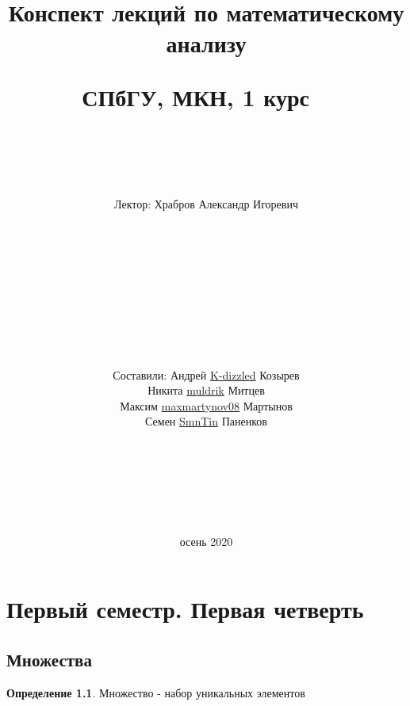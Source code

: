 \documentclass[12pt,letterpaper]{report}
\title{Конспект лекций по математическому анализу

СПбГУ, МКН, 1 курс
\ \\
\ \\ \ \\
}
\author{Лектор: Храбров Александр Игоревич \\
\ \\ \ \\ \ \\ \ \\ \ \\ \ \\ \ \\ \ \\
\ \\ 
\begin{flushright}
Составили: Андрей \href{https://github.com/K-dizzled}{K-dizzled} Козырев \\ Никита  \href{https://github.com/muldrik}{muldrik} Митцев \\ Максим \href{https://github.com/maxmartynov08}{maxmartynov08} Мартынов \\ Семен \href{https://github.com/SmnTin}{SmnTin} Паненков
\end{flushright}
\ \\
\ \\
\ \\
\ \\
\ \\
\ \\}
\date{осень 2020}
\theoremstyle{definition}
\newtheorem*{conj}{Определение}
\begin{document}
\fi
\maketitle
\tableofcontents
\newpage
\chapter{Первый семестр. Первая четверть}
\section{Множества}
\begin{conj} Множество - набор уникальных элементов \end{conj}
\end{document}
